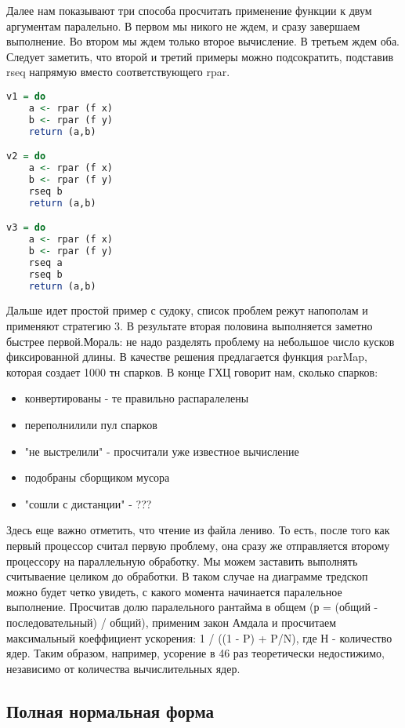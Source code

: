 \documentclass[10pt,a4paper]{article}
\begin{document}
Далее нам показывают три способа просчитать применение функции к двум аргументам паралельно. В первом мы никого не ждем, и сразу завершаем выполнение. Во втором мы ждем только второе вычисление. В третьем ждем оба. Следует заметить, что второй и третий примеры можно подсократить, подставив rseq напрямую вместо соответствующего rpar. 


\begin{lstlisting}[language=Haskell]
v1 = do
	a <- rpar (f x)
	b <- rpar (f y)
	return (a,b)

v2 = do
	a <- rpar (f x)
	b <- rpar (f y)
	rseq b
	return (a,b)

v3 = do
	a <- rpar (f x)
	b <- rpar (f y)
	rseq a
	rseq b
	return (a,b)

\end{lstlisting}

Дальше идет простой пример с судоку, список проблем режут напополам и применяют стратегию 3. В результате вторая половина выполняется заметно быстрее первой.Мораль: не надо разделять проблему на небольшое число кусков фиксированной длины. В качестве решения предлагается функция parMap, которая создает 1000 тн спарков. В конце  ГХЦ говорит нам, сколько спарков:
\begin{itemize}
\item конвертированы - те правильно распаралелены
\item переполнилили пул спарков
\item "не выстрелили" - просчитали уже известное вычисление
\item подобраны сборщиком мусора
\item "сошли с дистанции" - ???
\end{itemize}

Здесь еще важно отметить, что чтение из файла лениво. То есть, после того как первый процессор считал первую проблему, она сразу же отправляется второму процессору на параллельную обработку. Мы можем заставить выполнять считываение целиком до обработки. В таком случае на диаграмме тредскоп можно будет четко увидеть, с какого момента начинается паралельное выполнение. Просчитав долю паралельного рантайма в общем (р = (общий - последовательный) / общий), применим закон Амдала и просчитаем максимальный коеффициент ускорения: 1 / ((1 - P) + P/N), где Н -  количество ядер. Таким образом, например, усорение в 46 раз теоретически недостижимо, независимо от количества вычислительных ядер.\\

\subsection{Полная нормальная форма}
\end{document}

